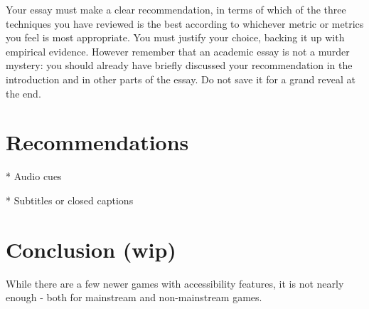 \documentclass{scrartcl}
\begin{document}
Your essay must make a clear recommendation, in terms of which of the three techniques you have reviewed is the best according to whichever metric or metrics you feel is most appropriate. You must justify your choice, backing it up with empirical evidence. However remember that an academic essay is not a murder mystery: you should already have briefly discussed your recommendation in the introduction and in other parts of the essay. Do not save it for a grand reveal at the end.

\section{Recommendations}

* Audio cues

* Subtitles or closed captions

\section{Conclusion (wip)}

While there are a few newer games with accessibility features, it is not nearly enough - both for mainstream and non-mainstream games. 



\end{document}

